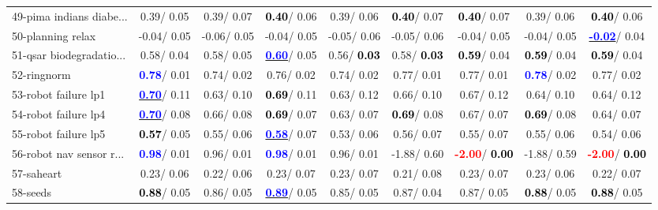 \begin{table}[h]
\begin{center}
\begin{tabular}{lc|c|c|c|c|c|c|c}
49-pima indians diabe... &   0.39/  0.05 &   0.39/  0.07 & \textcolor{black}{\textbf{  0.40}}/  0.06 &   0.39/  0.06 & \textcolor{black}{\textbf{  0.40}}/  0.07 & \textcolor{black}{\textbf{  0.40}}/  0.07 &   0.39/  0.06 & \textcolor{black}{\textbf{  0.40}}/  0.06 \\
50-planning relax &  -0.04/  0.05 &  -0.06/  0.05 &  -0.04/  0.05 &  -0.05/  0.06 &  -0.05/  0.06 &  -0.04/  0.05 &  -0.04/  0.05 & \underline{\textcolor{blue}{\textbf{ -0.02}}}/  0.04 \\
51-qsar biodegradatio... &   0.58/  0.04 &   0.58/  0.05 & \underline{\textcolor{blue}{\textbf{  0.60}}}/  0.05 &   0.56/\textcolor{black}{\textbf{  0.03}} &   0.58/\textcolor{black}{\textbf{  0.03}} & \textcolor{black}{\textbf{  0.59}}/  0.04 & \textcolor{black}{\textbf{  0.59}}/  0.04 & \textcolor{black}{\textbf{  0.59}}/  0.04 \\
52-ringnorm & \textcolor{blue}{\textbf{  0.78}}/  0.01 &   0.74/  0.02 &   0.76/  0.02 &   0.74/  0.02 &   0.77/  0.01 &   0.77/  0.01 & \textcolor{blue}{\textbf{  0.78}}/  0.02 &   0.77/  0.02 \\
53-robot failure lp1 & \underline{\textcolor{blue}{\textbf{  0.70}}}/  0.11 &   0.63/  0.10 & \textcolor{black}{\textbf{  0.69}}/  0.11 &   0.63/  0.12 &   0.66/  0.10 &   0.67/  0.12 &   0.64/  0.10 &   0.64/  0.12 \\ \hline
54-robot failure lp4 & \underline{\textcolor{blue}{\textbf{  0.70}}}/  0.08 &   0.66/  0.08 & \textcolor{black}{\textbf{  0.69}}/  0.07 &   0.63/  0.07 & \textcolor{black}{\textbf{  0.69}}/  0.08 &   0.67/  0.07 & \textcolor{black}{\textbf{  0.69}}/  0.08 &   0.64/  0.07 \\
55-robot failure lp5 & \textcolor{black}{\textbf{  0.57}}/  0.05 &   0.55/  0.06 & \underline{\textcolor{blue}{\textbf{  0.58}}}/  0.07 &   0.53/  0.06 &   0.56/  0.07 &   0.55/  0.07 &   0.55/  0.06 &   0.54/  0.06 \\
56-robot nav sensor r... & \textcolor{blue}{\textbf{  0.98}}/  0.01 &   0.96/  0.01 & \textcolor{blue}{\textbf{  0.98}}/  0.01 &   0.96/  0.01 &  -1.88/  0.60 & \textcolor{red}{\textbf{ -2.00}}/\textcolor{black}{\textbf{  0.00}} &  -1.88/  0.59 & \textcolor{red}{\textbf{ -2.00}}/\textcolor{black}{\textbf{  0.00}} \\
57-saheart &   0.23/  0.06 &   0.22/  0.06 &   0.23/  0.07 &   0.23/  0.07 &   0.21/  0.08 &   0.23/  0.07 &   0.23/  0.06 &   0.22/  0.07 \\
58-seeds & \textcolor{black}{\textbf{  0.88}}/  0.05 &   0.86/  0.05 & \underline{\textcolor{blue}{\textbf{  0.89}}}/  0.05 &   0.85/  0.05 &   0.87/  0.04 &   0.87/  0.05 & \textcolor{black}{\textbf{  0.88}}/  0.05 & \textcolor{black}{\textbf{  0.88}}/  0.05 \\

\end{tabular}
\end{center}
\end{table}
